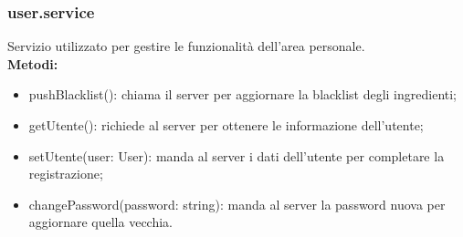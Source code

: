 \subsubsection{user.service}
Servizio utilizzato per gestire le funzionalità dell'area personale.\\
\textbf{Metodi:}
\begin{itemize}
    \item pushBlacklist(): chiama il server per aggiornare la blacklist degli ingredienti;
    \item getUtente(): richiede al server per ottenere le informazione dell'utente;
    \item setUtente(user: User): manda al server i dati dell'utente per completare la registrazione;
    \item changePassword(password: string): manda al server la password nuova per aggiornare quella vecchia.
\end{itemize}